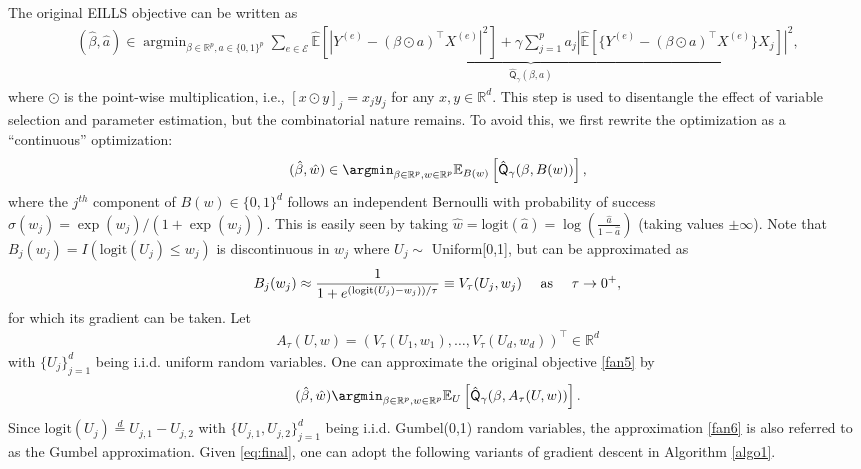 \documentclass[10pt]{article}
\numberwithin{equation}{section}
\begin{document}
The original EILLS objective can be written as 
\begin{align}
\label{fan5}
    (\hat{\beta}, \hat{a}) \in \mathop{\mathrm{argmin}}_{\beta \in \mathbb{R}^p, a\in \{0,1\}^p} \underbrace{\sum_{e\in \mathcal{E}} \hat{\mathbb{E}}[|Y^{(e)} - (\beta \odot a)^\top X^{(e)}|^2] + \gamma \sum_{j=1}^p a_j \left|\hat{\mathbb{E}}[\{Y^{(e)} - (\beta \odot a)^\top X^{(e)}\} X_j] \right|^2}_{\hat{\mathsf{Q}}_\gamma(\beta, a)},
\end{align} where $\odot$ is the point-wise multiplication, i.e., $[x \odot y]_j = x_j y_j$ for any $x, y\in \mathbb{R}^d$. This step is used to disentangle the effect of variable selection and parameter estimation, but the combinatorial nature remains. To avoid this, we first rewrite the optimization as a ``continuous'' optimization:
\begin{align*}
    (\hat{\beta}, \hat{w}) \in \argmin_{\beta \in \mathbb{R}^p, w\in \mathbb{R}^p} \mathbb{E}_{B(w)} \left [ \hat{\mathsf{Q}}_\gamma(\beta, B(w)) \right ],
\end{align*}
where the $j^{th}$ component of $B(w) \in \{0, 1\}^d$ follows an independent Bernoulli with probability of success $\sigma(w_j) = \exp(w_j)/(1+\exp(w_j))$.  This is easily seen by taking $\hat{w} = \mathrm{logit}(\hat a)= \log (\frac{\hat a}{1 - \hat a})$ (taking values $\pm \infty$).  Note that $B_j(w_j) = I(\mathrm{logit} (U_j) \leq w_j)$ is discontinuous in $w_j$ where $U_j \sim$ Uniform[0,1], but can be approximated as
\begin{equation} \label{fan6}
    B_j(w_j) \approx \frac{1}{1 + e^{ (\mbox{\scriptsize logit}(U_j) - w_j))/\tau}} \equiv V_\tau(U_j, w_j) ~~~~ \text{as} ~~~~\tau \to 0^+,
\end{equation}
for which its gradient can be taken.  Let
\begin{align*}
    A_\tau(U, w) = (V_\tau(U_{1}, w_1),\ldots, V_\tau(U_{d}, w_d))^\top \in \mathbb{R}^d
\end{align*} with $\{U_j\}_{j=1}^d$ being i.i.d. uniform random variables.
One can approximate the original objective \eqref{fan5} by
\begin{align}
\label{eq:final}
    (\hat{\beta}, \hat{w}) \argmin_{\beta \in \mathbb{R}^p, w\in \mathbb{R}^p} \mathbb{E}_{U} \left [ \hat{\mathsf{Q}}_\gamma(\beta, A_\tau(U, w)) \right ].
\end{align} 
Since $\mathrm{logit}(U_j) \stackrel{d}{=} U_{j,1}- U_{j, 2}$ with $\{U_{j,1}, U_{j,2}\}_{j=1}^d$ being i.i.d. Gumbel(0,1) random variables, the approximation \eqref{fan6} is also referred to as the Gumbel approximation. Given \eqref{eq:final}, one can adopt the following variants of gradient descent in Algorithm \ref{algo1}.
\end{document}
